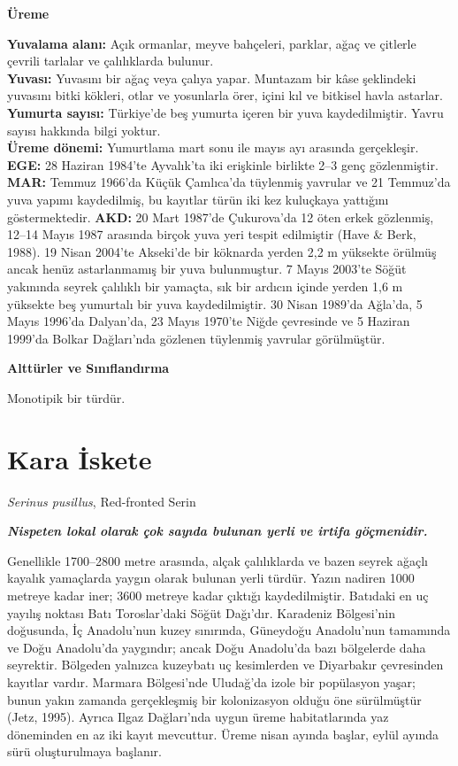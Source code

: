 \documentclass[
  10.5pt,
  a4paper,
  DIV=11,
  numbers=noendperiod,
  twocolumn]{scrreprt}
\begin{document}
\textbf{Üreme}

\textbf{Yuvalama alanı:} Açık ormanlar, meyve bahçeleri, parklar, ağaç
ve çitlerle çevrili tarlalar ve çalılıklarda bulunur.\\
\textbf{Yuvası:} Yuvasını bir ağaç veya çalıya yapar. Muntazam bir kâse
şeklindeki yuvasını bitki kökleri, otlar ve yosunlarla örer, içini kıl
ve bitkisel havla astarlar.\\
\textbf{Yumurta sayısı:} Türkiye'de beş yumurta içeren bir yuva
kaydedilmiştir. Yavru sayısı hakkında bilgi yoktur.\\
\textbf{Üreme dönemi:} Yumurtlama mart sonu ile mayıs ayı arasında
gerçekleşir. \textbf{EGE:} 28 Haziran 1984'te Ayvalık'ta iki erişkinle
birlikte 2--3 genç gözlenmiştir. \textbf{MAR:} Temmuz 1966'da Küçük
Çamlıca'da tüylenmiş yavrular ve 21 Temmuz'da yuva yapımı kaydedilmiş,
bu kayıtlar türün iki kez kuluçkaya yattığını göstermektedir.
\textbf{AKD:} 20 Mart 1987'de Çukurova'da 12 öten erkek gözlenmiş,
12--14 Mayıs 1987 arasında birçok yuva yeri tespit edilmiştir (Have \&
Berk, 1988). 19 Nisan 2004'te Akseki'de bir köknarda yerden 2,2 m
yüksekte örülmüş ancak henüz astarlanmamış bir yuva bulunmuştur. 7 Mayıs
2003'te Söğüt yakınında seyrek çalılıklı bir yamaçta, sık bir ardıcın
içinde yerden 1,6 m yüksekte beş yumurtalı bir yuva kaydedilmiştir. 30
Nisan 1989'da Ağla'da, 5 Mayıs 1996'da Dalyan'da, 23 Mayıs 1970'te Niğde
çevresinde ve 5 Haziran 1999'da Bolkar Dağları'nda gözlenen tüylenmiş
yavrular görülmüştür.

\textbf{Alttürler ve Sınıflandırma}

Monotipik bir türdür.

\section{Kara İskete}\label{kara-iskete}

\emph{Serinus pusillus}, Red-fronted Serin

\textbf{\emph{Nispeten lokal olarak çok sayıda bulunan yerli ve irtifa
göçmenidir.}}

Genellikle 1700--2800 metre arasında, alçak çalılıklarda ve bazen seyrek
ağaçlı kayalık yamaçlarda yaygın olarak bulunan yerli türdür. Yazın
nadiren 1000 metreye kadar iner; 3600 metreye kadar çıktığı
kaydedilmiştir. Batıdaki en uç yayılış noktası Batı Toroslar'daki Söğüt
Dağı'dır. Karadeniz Bölgesi'nin doğusunda, İç Anadolu'nun kuzey
sınırında, Güneydoğu Anadolu'nun tamamında ve Doğu Anadolu'da yaygındır;
ancak Doğu Anadolu'da bazı bölgelerde daha seyrektir. Bölgeden yalnızca
kuzeybatı uç kesimlerden ve Diyarbakır çevresinden kayıtlar vardır.
Marmara Bölgesi'nde Uludağ'da izole bir popülasyon yaşar; bunun yakın
zamanda gerçekleşmiş bir kolonizasyon olduğu öne sürülmüştür (Jetz,
1995). Ayrıca Ilgaz Dağları'nda uygun üreme habitatlarında yaz
döneminden en az iki kayıt mevcuttur. Üreme nisan ayında başlar, eylül
ayında sürü oluşturulmaya başlanır.
\end{document}

